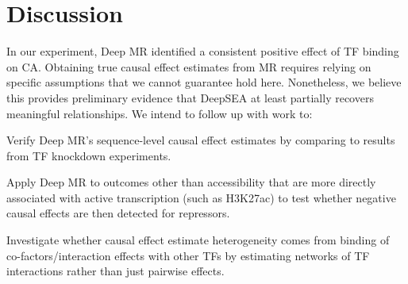 \documentclass{article}
\begin{document}
\section{Discussion}
In our experiment, Deep MR identified a consistent positive effect of TF binding on CA. Obtaining true causal effect estimates from MR requires relying on specific assumptions that we cannot guarantee hold here. Nonetheless, we believe this provides preliminary evidence that DeepSEA at least partially recovers meaningful relationships. We intend to follow up with work to:
\begin{compactitem}
    \item Verify Deep MR's sequence-level causal effect estimates by comparing to results from TF knockdown experiments.
    \item Apply Deep MR to outcomes other than accessibility that are more directly associated with active transcription (such as H3K27ac) to test whether negative causal effects are then detected for repressors.
    \item Investigate whether causal effect estimate heterogeneity comes from binding of co-factors/interaction effects with other TFs by estimating networks of TF interactions rather than just pairwise effects.
\end{compactitem}

\clearpage



\end{document}
